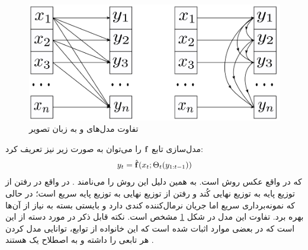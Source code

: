 \begin{figure}[h]
	\centering
	\includegraphics[width=.5\textwidth]{images/flow-survey2.png}
	\caption{
        تفاوت مدل‌های  و  به زبان تصویر \cite{iaf, maf, flow_survey}
	}
\label{fig:chap2:mafvsiaf}
\end{figure}

مدل‌سازی تابع \autoregressive{}
${\bf f}$
را می‌توان به صورت زیر نیز تعریف کرد:
\begin{align}
	y_t = \hat{{\bf f}}(x_t; \Theta_t(y_{1:t-1}))
\end{align}
که در واقع عکس روش  است. به همین دلیل این روش را  می‌نامند \cite{iaf, flow_survey}. در واقع در  رفتن از توزیع پایه به توزیع نهایی کُند و رفتن از توزیع نهایی به توزیع پایه سریع است؛ در حالی که  نمونه‌برداری سریع اما جریان نرمال‌کننده کندی دارد و بایستی بسته به نیاز از آن‌ها بهره برد. تفاوت این مدل در شکل \ref{fig:chap2:mafvsiaf} مشخص است.
نکته قابل ذکر در مورد دسته \autoregressive{}  از \normalizingflownets{} این است که در  بعضی موارد اثبات شده است که این خانواده از توابع، توانایی مدل کردن هر تابعی را داشته و به اصطلاح یک
هستند \cite{flow_survey}.

